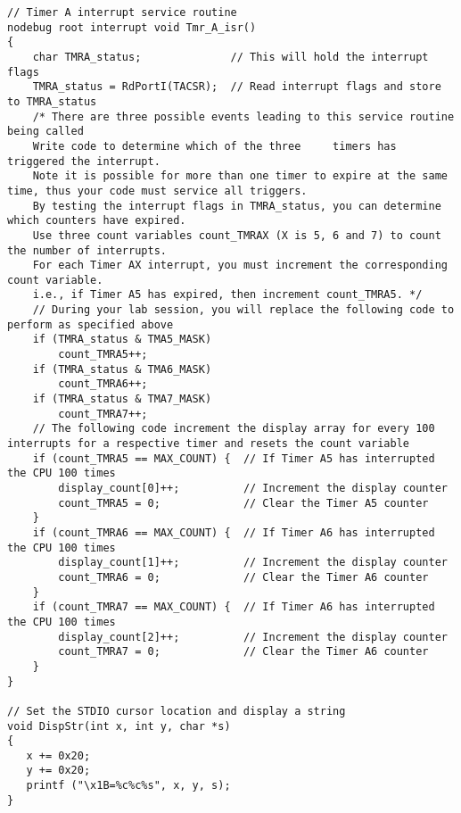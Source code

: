 \begin{lstlisting}[frame=single]
// Timer A interrupt service routine
nodebug root interrupt void Tmr_A_isr()
{
    char TMRA_status;              // This will hold the interrupt flags
    TMRA_status = RdPortI(TACSR);  // Read interrupt flags and store to TMRA_status
    /* There are three possible events leading to this service routine being called
    Write code to determine which of the three     timers has triggered the interrupt.
    Note it is possible for more than one timer to expire at the same time, thus your code must service all triggers.
    By testing the interrupt flags in TMRA_status, you can determine which counters have expired.
    Use three count variables count_TMRAX (X is 5, 6 and 7) to count the number of interrupts.
    For each Timer AX interrupt, you must increment the corresponding count variable.
    i.e., if Timer A5 has expired, then increment count_TMRA5. */
    // During your lab session, you will replace the following code to perform as specified above
    if (TMRA_status & TMA5_MASK)
    	count_TMRA5++;
    if (TMRA_status & TMA6_MASK)
    	count_TMRA6++;
    if (TMRA_status & TMA7_MASK)
    	count_TMRA7++;
    // The following code increment the display array for every 100 interrupts for a respective timer and resets the count variable
    if (count_TMRA5 == MAX_COUNT) {  // If Timer A5 has interrupted the CPU 100 times
        display_count[0]++;          // Increment the display counter
        count_TMRA5 = 0;             // Clear the Timer A5 counter
    }
    if (count_TMRA6 == MAX_COUNT) {  // If Timer A6 has interrupted the CPU 100 times
        display_count[1]++;          // Increment the display counter
        count_TMRA6 = 0;             // Clear the Timer A6 counter
    }
    if (count_TMRA7 == MAX_COUNT) {  // If Timer A6 has interrupted the CPU 100 times
        display_count[2]++;          // Increment the display counter
        count_TMRA7 = 0;             // Clear the Timer A6 counter
    }
}

// Set the STDIO cursor location and display a string
void DispStr(int x, int y, char *s)
{
   x += 0x20;
   y += 0x20;
   printf ("\x1B=%c%c%s", x, y, s);
}
\end{lstlisting}